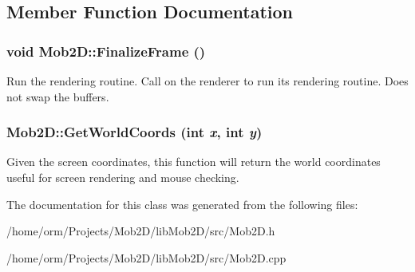 \subsection{Member Function Documentation}
\hypertarget{classMob2D_ab18c40a9be87387c4bfa3cfe336ff36e}{
\subsubsection[{FinalizeFrame}]{\setlength{\rightskip}{0pt plus 5cm}void Mob2D::FinalizeFrame ()}}
\label{classMob2D_ab18c40a9be87387c4bfa3cfe336ff36e}
Run the rendering routine. Call on the renderer to run its rendering routine. Does not swap the buffers. \hypertarget{classMob2D_a62b6dadda85f5aee74448282d8cae423}{
\subsubsection[{GetWorldCoords}]{ Mob2D::GetWorldCoords (int {\em x}, \/  int {\em y})}}
\label{classMob2D_a62b6dadda85f5aee74448282d8cae423}
Given the screen coordinates, this function will return the world coordinates useful for screen rendering and mouse checking. 

The documentation for this class was generated from the following files:\begin{DoxyCompactItemize}
\item 
/home/orm/Projects/Mob2D/libMob2D/src/Mob2D.h\item 
/home/orm/Projects/Mob2D/libMob2D/src/Mob2D.cpp\end{DoxyCompactItemize}
